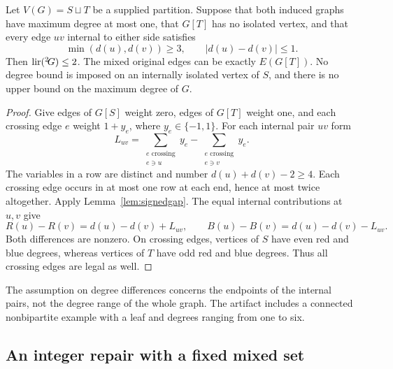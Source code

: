 \begin{theorem}\label{thm:integerpairs}
Let $V(G)=S\sqcup T$ be a supplied partition. Suppose that both induced
graphs have maximum degree at most one, that $G[T]$ has no isolated
vertex, and that every edge $uv$ internal to either side satisfies
\[
 \min(d(u),d(v))\ge3,\qquad |d(u)-d(v)|\le1.
\]
Then $\operatorname{lir}({}^{2}\!G)\le2$. The mixed original edges can be exactly
$E(G[T])$. No degree bound is imposed on an internally isolated vertex
of $S$, and there is no upper bound on the maximum degree of $G$.
\end{theorem}
\begin{proof}
Give edges of $G[S]$ weight zero, edges of $G[T]$ weight one, and each
crossing edge $e$ weight $1+y_e$, where $y_e\in\{-1,1\}$. For each
internal pair $uv$ form
\[
 L_{uv}=\sum_{\substack{e\text{ crossing}\\e\ni u}}y_e
       -\sum_{\substack{e\text{ crossing}\\e\ni v}}y_e.
\]
The variables in a row are distinct and number $d(u)+d(v)-2\ge4$.
Each crossing edge occurs in at most one row at each end, hence at most
twice altogether. Apply Lemma~\ref{lem:signedgap}. The equal internal
contributions at $u,v$ give
\begin{equation}\label{eq:integerpairdifference}
 R(u)-R(v)=d(u)-d(v)+L_{uv},\qquad
 B(u)-B(v)=d(u)-d(v)-L_{uv}.
\end{equation}
Both differences are nonzero. On crossing edges, vertices of $S$ have
even red and blue degrees, whereas vertices of $T$ have odd red and
blue degrees. Thus all crossing edges are legal as well.
\end{proof}

The assumption on degree differences concerns the endpoints of the
internal pairs, not the degree range of the whole graph. The artifact
includes a connected nonbipartite example with a leaf and degrees
ranging from one to six.

\subsection{An integer repair with a fixed mixed set}

